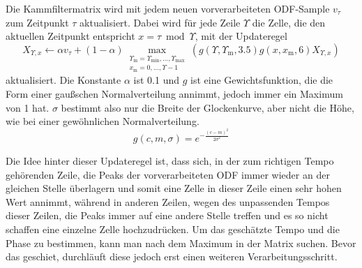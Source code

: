 {{{			%
			Die Kammfiltermatrix wird mit jedem neuen vorverarbeiteten ODF-Sample $v_\tau$ zum Zeitpunkt $\tau$ aktualisiert.
			Dabei wird für jede Zeile $\Upsilon$ die Zelle,
				die den aktuellen Zeitpunkt entspricht $x = \tau \bmod \Upsilon$,
				mit der Updateregel
				\begin{equation}
					X_{\Upsilon, x} \leftarrow
						\alpha v_\tau +
						(1 - \alpha) \max_{
							\substack{
								\Upsilon_\text{m} = \Upsilon_{\text{min}}, ..., \Upsilon_{\text{max}} \\
								x_\text{m} = 0, ..., \Upsilon - 1
							}
						}
						(g(\Upsilon, \Upsilon_\text{m}, 3.5) g(x, x_\text{m}, 6) X_{\Upsilon, x})
				\end{equation}
				aktualisiert.
			Die Konstante $\alpha$ ist \num{0.1}
				und $g$ ist eine Gewichtsfunktion,
				die die Form einer gaußschen Normalverteilung annimmt,
				jedoch immer ein Maximum von \num{1} hat.
			$\sigma$ bestimmt also nur die Breite der Glockenkurve,
				aber nicht die Höhe,
				wie bei einer gewöhnlichen Normalverteilung.
			\begin{equation}
				g(c, m, \sigma) = e^{-\frac{(c - m)^2}{2\sigma^2}}
			\end{equation}

			Die Idee hinter dieser Updateregel ist,
				dass sich,
				in der zum richtigen Tempo gehörenden Zeile,
				die Peaks der vorverarbeiteten ODF immer wieder an der gleichen Stelle überlagern
				und somit eine Zelle in dieser Zeile einen sehr hohen Wert annimmt,
				während in anderen Zeilen,
				wegen des unpassenden Tempos dieser Zeilen,
				die Peaks immer auf eine andere Stelle treffen
				und es so nicht schaffen eine einzelne Zelle hochzudrücken.
			Um das geschätzte Tempo und die Phase zu bestimmen,
				kann man nach dem Maximum in der Matrix suchen.
			Bevor das geschiet,
				durchläuft diese jedoch erst einen weiteren Verarbeitungsschritt.

}}}
